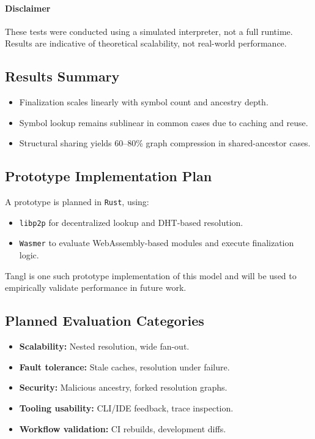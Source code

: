 \documentclass[sigplan,screen]{acmart}
\begin{document}
\paragraph{Disclaimer}
These tests were conducted using a simulated interpreter, not a full runtime. Results are indicative of theoretical scalability, not real-world performance.

\subsection{Results Summary}

\begin{itemize}
  \item Finalization scales linearly with symbol count and ancestry depth.
  \item Symbol lookup remains sublinear in common cases due to caching and reuse.
  \item Structural sharing yields 60--80\% graph compression in shared-ancestor cases.
\end{itemize}

\subsection{Prototype Implementation Plan}

A prototype is planned in \texttt{Rust}, using:

\begin{itemize}
  \item \texttt{libp2p} for decentralized lookup and DHT-based resolution.
  \item \texttt{Wasmer} to evaluate WebAssembly-based modules and execute finalization logic.
\end{itemize}

Tangl is one such prototype implementation of this model and will be used to empirically validate performance in future work.

\subsection{Planned Evaluation Categories}

\begin{itemize}
  \item \textbf{Scalability:} Nested resolution, wide fan-out.
  \item \textbf{Fault tolerance:} Stale caches, resolution under failure.
  \item \textbf{Security:} Malicious ancestry, forked resolution graphs.
  \item \textbf{Tooling usability:} CLI/IDE feedback, trace inspection.
  \item \textbf{Workflow validation:} CI rebuilds, development diffs.
\end{itemize}
\end{document}
